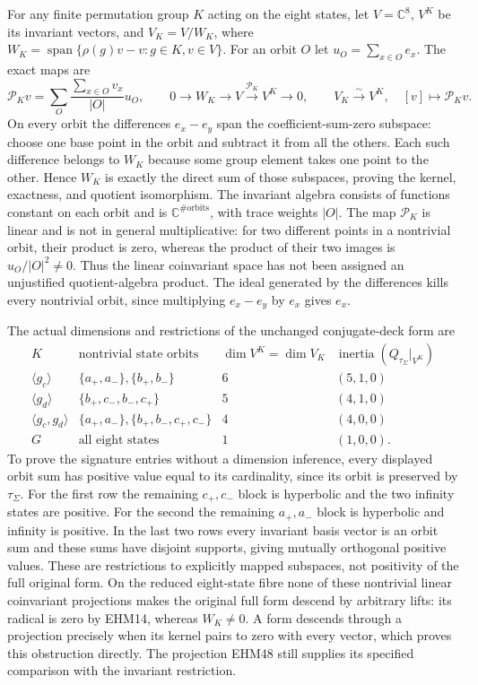 \documentclass[
  10pt,
  a4paper,
]{article}
\begin{document}
For any finite permutation group \(K\) acting on the eight states, let
\(V=\mathbb C^8\), \(V^K\) be its invariant vectors, and \(V_K=V/W_K\),
where \(W_K=\operatorname{span}\{\rho(g)v-v:g\in K,v\in V\}\). For an
orbit \(O\) let \(u_O=\sum_{x\in O}e_x\). The exact maps are \[
\mathcal P_Kv=\sum_{O}\frac{\sum_{x\in O}v_x}{|O|}u_O,
\qquad
0\longrightarrow W_K\longrightarrow V\xrightarrow{\mathcal P_K}V^K\longrightarrow0,
\qquad V_K\xrightarrow{\sim}V^K,\quad[v]\mapsto\mathcal P_Kv.
\tag{EHM48}
\] On every orbit the differences \(e_x-e_y\) span the
coefficient-sum-zero subspace: choose one base point in the orbit and
subtract it from all the others. Each such difference belongs to \(W_K\)
because some group element takes one point to the other. Hence \(W_K\)
is exactly the direct sum of those subspaces, proving the kernel,
exactness, and quotient isomorphism. The invariant algebra consists of
functions constant on each orbit and is
\(\mathbb C^{\#\mathrm{orbits}}\), with trace weights \(|O|\). The map
\(\mathcal P_K\) is linear and is not in general multiplicative: for two
different points in a nontrivial orbit, their product is zero, whereas
the product of their two images is \(u_O/|O|^2\ne0\). Thus the linear
coinvariant space has not been assigned an unjustified quotient-algebra
product. The ideal generated by the differences kills every nontrivial
orbit, since multiplying \(e_x-e_y\) by \(e_x\) gives \(e_x\).

The actual dimensions and restrictions of the unchanged conjugate-deck
form are \[
\begin{array}{c|c|c|c}
K&\text{nontrivial state orbits}&\dim V^K=\dim V_K&
\operatorname{inertia}(Q_{\tau_\Sigma}|_{V^K})\\\hline
\langle g_c\rangle&\{a_+,a_-\},\{b_+,b_-\}&6&(5,1,0)\\
\langle g_d\rangle&\{b_+,c_-,b_-,c_+\}&5&(4,1,0)\\
\langle g_c,g_d\rangle&\{a_+,a_-\},\{b_+,b_-,c_+,c_-\}&4&(4,0,0)\\
G&\text{all eight states}&1&(1,0,0).
\end{array}
\tag{EHM49}
\] To prove the signature entries without a dimension inference, every
displayed orbit sum has positive value equal to its cardinality, since
its orbit is preserved by \(\tau_\Sigma\). For the first row the
remaining \(c_+,c_-\) block is hyperbolic and the two infinity states
are positive. For the second the remaining \(a_+,a_-\) block is
hyperbolic and infinity is positive. In the last two rows every
invariant basis vector is an orbit sum and these sums have disjoint
supports, giving mutually orthogonal positive values. These are
restrictions to explicitly mapped subspaces, not positivity of the full
original form. On the reduced eight-state fibre none of these nontrivial
linear coinvariant projections makes the original full form descend by
arbitrary lifts: its radical is zero by EHM14, whereas \(W_K\ne0\). A
form descends through a projection precisely when its kernel pairs to
zero with every vector, which proves this obstruction directly. The
projection EHM48 still supplies its specified comparison with the
invariant restriction.
\end{document}
